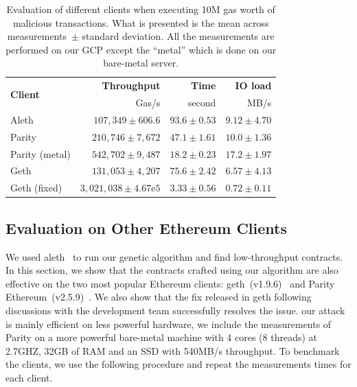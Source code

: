   \begin{table}
    \centering
    \setlength{\tabcolsep}{3pt}
    \caption{Evaluation of different clients when executing 10M gas worth of malicious transactions. What is presented is the mean across  measurements~$\pm$ standard deviation. All the measurements are performed on our GCP except the ``metal'' which is done on our bare-metal server.}
    \label{tab:clients-evaluation}
    \begin{tabular}{l r r r}
      \toprule
      \multirow{2}{*}{\textbf{Client}} & \textbf{Throughput}             & \textbf{Time}   & \textbf{IO load} \\
                                       & Gas/s                           & second          & MB/s             \\
      \midrule
      Aleth                            & $107,349\pm 606.6$              & $93.6\pm 0.53$  & $9.12\pm 4.70$   \\
      Parity                           & $210,746\pm 7,672$              & $47.1\pm 1.61$  & $10.0\pm 1.36$   \\
      Parity (\small{metal})           & $542,702\pm 9,487$              & $18.2\pm 0.23$  & $17.2\pm 1.97$   \\
      Geth                             & $131,053\pm 4,207$              & $75.6\pm 2.42$  & $6.57\pm 4.13$   \\
      Geth (\small{fixed})             & $3,021,038 \pm 4.67\mathrm{e}5$ & $3.33 \pm 0.56$ & $0.72\pm 0.11$   \\
      \bottomrule
    \end{tabular}
  \end{table}

  \subsection{Evaluation on Other Ethereum Clients}
  We used aleth~\cite{aleth} to run our genetic algorithm and find low-throughput contracts. In this section, we show that the contracts crafted using our algorithm are also effective on the two most popular Ethereum clients: geth~(v1.9.6)~\cite{geth} and Parity Ethereum~(v2.5.9)~\cite{parity-ethereum}. We also show that the fix released in geth following discussions with the development team successfully resolves the issue. our attack is mainly efficient on less powerful hardware, we include the measurements of Parity on a more powerful bare-metal machine with 4 cores (8 threads) at 2.7GHZ, 32GB of RAM and an SSD with 540MB/s throughput.
  To benchmark the clients, we use the following procedure and repeat the measurements  times for each client.

